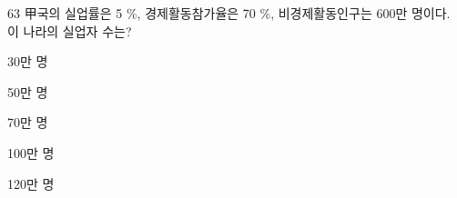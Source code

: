 \begin{question}{63}
甲국의 실업률은 5 \%, 경제활동참가율은 70 \%, 비경제활동인구는 600만 명이다. 이 나라의 실업자 수는?
\begin{choices}
  \item 30만 명
  \item 50만 명
  \item 70만 명
  \item 100만 명
  \item 120만 명
\end{choices}
\end{question}
